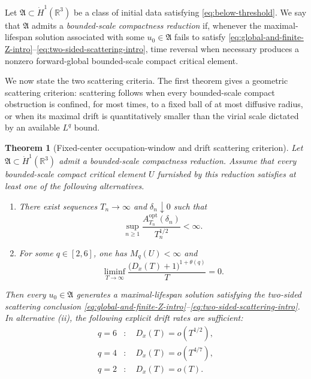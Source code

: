\documentclass[preprint,12pt]{elsarticle}
\numberwithin{equation}{section}
\newtheorem{theorem}{Theorem}[section]
\theoremstyle{remark}
\newcommand{\R}{\mathbb R}
\newcommand{\Aopt}{A^{\mathrm{opt}}}
\begin{document}
Let $\mathfrak A\subset\dot H^1(\R^3)$ be a class of initial data satisfying \eqref{eq:below-threshold}.  We say that $\mathfrak A$ admits a \emph{bounded-scale compactness reduction} if, whenever the maximal-lifespan solution associated with some $u_0\in\mathfrak A$ fails to satisfy \eqref{eq:global-and-finite-Z-intro}--\eqref{eq:two-sided-scattering-intro}, time reversal when necessary produces a nonzero forward-global bounded-scale compact critical element.

We now state the two scattering criteria. The first theorem gives a geometric scattering criterion: scattering follows when every bounded-scale compact obstruction is confined, for most times, to a fixed ball of at most diffusive radius, or when its maximal drift is quantitatively smaller than the virial scale dictated by an available $L^q$ bound.

\begin{theorem}[Fixed-center occupation-window and drift scattering criterion]\label{thm:window-scattering}
Let $\mathfrak A\subset\dot H^1(\R^3)$ admit a bounded-scale compactness reduction. Assume that every bounded-scale compact critical element $U$ furnished by this reduction satisfies at least one of the following alternatives.
\begin{enumerate}[label=\textup{(\roman*)},leftmargin=2.4em]
\item There exist sequences $T_n\to\infty$ and $\delta_n\downarrow0$ such that
\begin{equation}\label{eq:window-scattering-condition}
  \sup_{n\ge1}
  \frac{\Aopt_{T_n}(\delta_n)}{T_n^{1/2}}<\infty.
\end{equation}
\item For some $q\in[2,6]$, one has $M_q(U)<\infty$ and
\begin{equation}\label{eq:drift-scattering-condition}
  \liminf_{T\to\infty}
  \frac{\bigl(D_x(T)+1\bigr)^{1+\theta(q)}}{T}=0.
\end{equation}
\end{enumerate}
Then every $u_0\in\mathfrak A$ generates a maximal-lifespan solution satisfying the two-sided scattering conclusion \eqref{eq:global-and-finite-Z-intro}--\eqref{eq:two-sided-scattering-intro}.  In alternative \textup{(ii)}, the following explicit drift rates are sufficient:
\begin{equation}\label{eq:drift-rate-examples}
  \begin{aligned}
  q=6&:\quad D_x(T)=o(T^{1/2}),\\
  q=4&:\quad D_x(T)=o(T^{4/7}),\\
  q=2&:\quad D_x(T)=o(T).
  \end{aligned}
\end{equation}
\end{theorem}
\end{document}
